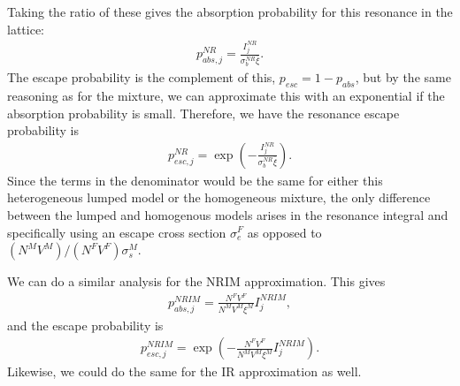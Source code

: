 Taking the ratio of these gives the absorption probability for this resonance in the lattice:
\begin{align}
  p_{abs,j}^{NR} = \frac{ I_j^{NR} }{ \sigma_b^{NR} \overline{\xi} } . 
\end{align}
The escape probability is the complement of this, $p_{esc} = 1 - p_{abs}$, but by the same reasoning as for the mixture, we can approximate this with an exponential if the absorption probability is small. Therefore, we have the resonance escape probability is
\begin{align}
  p_{esc,j}^{NR} = \exp\left( -\frac{ I_j^{NR} }{ \sigma_b^{NR} \overline{\xi} } \right) . 
\end{align}
Since the terms in the denominator would be the same for either this heterogeneous lumped model or the homogeneous mixture, the only difference between the lumped and homogenous models arises in the resonance integral and specifically using an escape cross section $\sigma_e^F$ as opposed to $(N^M V^M)/(N^F V^F) \sigma_s^M$.

We can do a similar analysis for the NRIM approximation. This gives
\begin{align}
  p_{abs,j}^{NRIM} = \frac{ N^F V^F }{ N^M V^M \xi^M } I_j^{NRIM} ,
\end{align}
and the escape probability is
\begin{align}
  p_{esc,j}^{NRIM} = \exp\left( -\frac{ N^F V^F }{ N^M V^M \xi^M } I_j^{NRIM} \right) . 
\end{align}
Likewise, we could do the same for the IR approximation as well.
